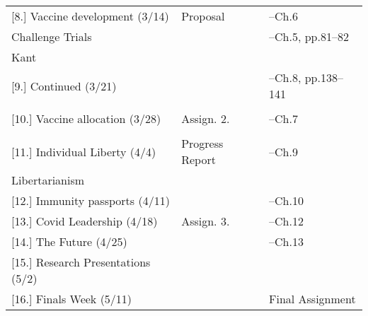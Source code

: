 \documentclass[article,oneside]{memoir}
\begin{document}
\begin{landscape}
\begin{center}
\begin{longtable}{p{6cm}p{6cm}p{4cm}}
[8.] Vaccine development (3/14)	 			& Proposal				& --Ch.6 \\ 
Challenge Trials				 	 		&						& --Ch.5, pp.81--82  \\ 
Kant										&						&    	\\ [1.8\baselineskip] \hline		

[9.] Continued	(3/21)			 			&  						&  --Ch.8, pp.138--141\\ 
										&						&    	\\ [1.8\baselineskip] \hline	 

[10.] Vaccine allocation (3/28)		 			& Assign. 2.				& --Ch.7  \\
	    									&      						&  \\  [1.8\baselineskip] \hline


[11.] Individual Liberty (4/4)					& Progress Report			& --Ch.9  \\ 
Libertarianism								&						& 	 \\ [1.8\baselineskip] \hline				


[12.] Immunity passports  (4/11) 	 			&  			    			 & --Ch.10 \\ [1.8\baselineskip] \hline

[13.] Covid Leadership  (4/18) 					&  Assign. 3.    		  		 & --Ch.12   \\ [1.8\baselineskip] \hline


[14.] The Future  (4/25) 			 			& 		     				 & --Ch.13   \\ [1.8\baselineskip] \hline


[15.] Research Presentations	(5/2)			 	&						&  \\ [1.8\baselineskip] \hline

[16.] Finals Week (5/11)						&						 & Final Assignment \\ [1.8\baselineskip] \hline
	

\end{longtable}
\end{center}
\end{landscape}
\end{document}

